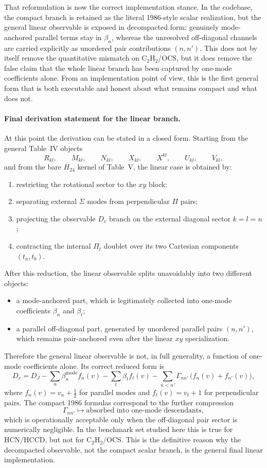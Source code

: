 \documentclass[11pt]{article}
\begin{document}
That reformulation is now the correct implementation stance. In the codebase,
the compact branch is retained as the literal 1986-style scalar realization,
but the general linear observable is exposed in decompacted form: genuinely
mode-anchored parallel terms stay in $\beta_n$, whereas the unresolved
off-diagonal channels are carried explicitly as unordered pair contributions
$(n,n')$. This does not by itself remove the quantitative mismatch on
C$_2$H$_2$/OCS, but it does remove the false claim that the whole linear branch
has been captured by one-mode coefficients alone. From an implementation point
of view, this is the first general form that is both executable and honest
about what remains compact and what does not.

\paragraph{Final derivation statement for the linear branch.}
At this point the derivation can be stated in a closed form. Starting from the
general Table~IV objects
\[
R_{kl},\qquad M_{kl},\qquad N_{kl},\qquad X_{kl},\qquad X^{kl},\qquad U_{kl},\qquad V_{kl},
\]
and from the bare $H_{24}$ kernel of Table~V, the linear case is obtained by:
\begin{enumerate}
\item restricting the rotational sector to the $xy$ block;
\item separating external $\Sigma$ modes from perpendicular $\Pi$ pairs;
\item projecting the observable $D_v$ branch on the external diagonal sector
  $k=l=n$;
\item contracting the internal $\Pi_t$ doublet over its two Cartesian
  components $(t_a,t_b)$.
\end{enumerate}
After this reduction, the linear observable splits unavoidably into two
different objects:
\begin{itemize}
\item a mode-anchored part, which is legitimately collected into one-mode
  coefficients $\beta_n$ and $\beta_t$;
\item a parallel off-diagonal part, generated by unordered parallel pairs
  $(n,n')$, which remains pair-anchored even after the linear $xy$
  specialization.
\end{itemize}
Therefore the general linear observable is not, in full generality, a function
of one-mode coefficients alone. Its correct reduced form is
\[
D_v
=
D_J
-\sum_n \beta_n^{\mathrm{mode}} f_n(v)
-\sum_t \beta_t f_t(v)
-\sum_{n<n'} \Gamma_{nn'}\,\bigl(f_n(v)+f_{n'}(v)\bigr),
\]
where $f_n(v)=v_n+\tfrac12$ for parallel modes and $f_t(v)=v_t+1$ for
perpendicular pairs. The compact 1986 formulas correspond to the further
compression
\[
\Gamma_{nn'} \mapsto \text{absorbed into one-mode descendants},
\]
which is operationally acceptable only when the off-diagonal pair sector is
numerically negligible. In the benchmark set studied here this is true for
HCN/HCCD, but not for C$_2$H$_2$/OCS. This is the definitive reason why the
decompacted observable, not the compact scalar branch, is the general final
linear implementation.
\end{document}
